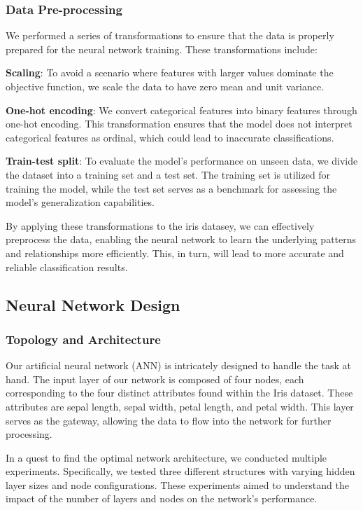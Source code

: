 \documentclass[conference]{inc/IEEEtran}
\begin{document}
\subsubsection{Data Pre-processing}

We performed a series of transformations to ensure that the data is properly prepared
for the neural network training. These transformations include:

\textbf{Scaling}: To avoid a scenario where features with larger values dominate the objective function, we scale the data to
    have zero mean and unit variance.
    
\textbf{One-hot encoding}: We convert categorical features into binary features through one-hot encoding. This transformation
    ensures that the model does not interpret categorical features as ordinal, which could lead to inaccurate classifications.
    
\textbf{Train-test split}: To evaluate the model's performance on unseen data, we divide the dataset into a training set and a
    test set. The training set is utilized for training the model, while the test set serves as a benchmark for assessing the
    model's generalization capabilities.

By applying these transformations to the iris datasey, we can effectively preprocess the data, enabling the neural
network to learn the underlying patterns and relationships more efficiently. This, in turn, will lead to more accurate and
reliable classification results.

\subsection{Neural Network Design}

\subsubsection{Topology and Architecture}

Our artificial neural network (ANN) is intricately designed to handle the task at hand. The input layer of our network is composed of four nodes, each corresponding to the four distinct attributes found within the Iris dataset. These attributes are sepal length, sepal width, petal length, and petal width. This layer serves as the gateway, allowing the data to flow into the network for further processing.

In a quest to find the optimal network architecture, we conducted multiple experiments. Specifically, we tested three different structures with varying hidden layer sizes and node configurations. These experiments aimed to understand the impact of the number of layers and nodes on the network's performance.
\end{document}
